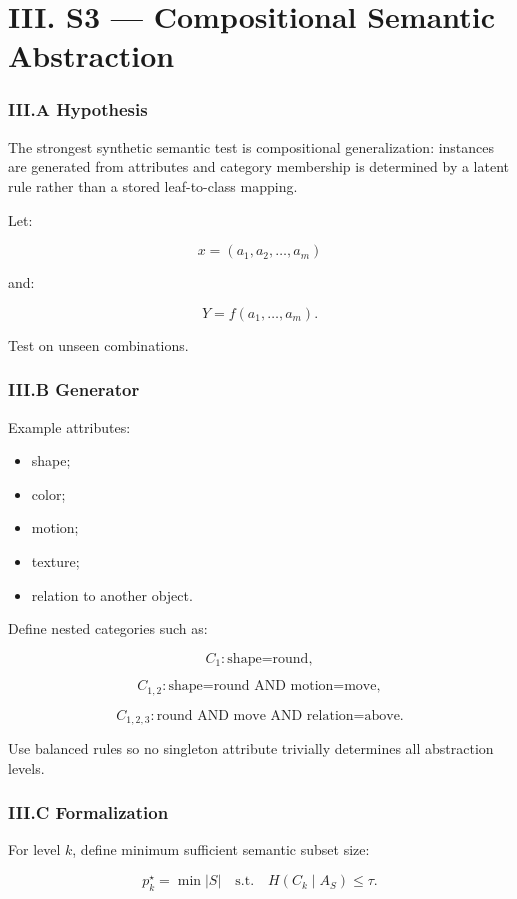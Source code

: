 \documentclass[10pt]{article}
\begin{document}
\part{III. S3 --- Compositional Semantic Abstraction}

\section{III.A Hypothesis}

The strongest synthetic semantic test is compositional generalization: instances are generated from attributes and category membership is determined by a latent rule rather than a stored leaf-to-class mapping.

Let:

\[
x=(a_1,a_2,\ldots,a_m)
\]

and:

\[
Y=f(a_1,\ldots,a_m).
\]

Test on unseen combinations.

\section{III.B Generator}

Example attributes:

\begin{itemize}
\item shape;
\item color;
\item motion;
\item texture;
\item relation to another object.
\end{itemize}

Define nested categories such as:

\[
C_1:\text{shape=round},
\]

\[
C_{1,2}:\text{shape=round AND motion=move},
\]

\[
C_{1,2,3}:\text{round AND move AND relation=above}.
\]

Use balanced rules so no singleton attribute trivially determines all abstraction levels.

\section{III.C Formalization}

For level \(k\), define minimum sufficient semantic subset size:

\[
p_k^\star
=
\min |S|
\quad\text{s.t.}\quad
H(C_k\mid A_S)\le \tau.
\]
\end{document}
